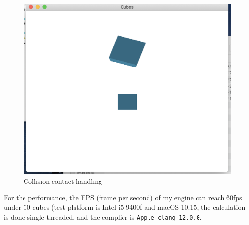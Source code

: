 \documentclass[acmtog]{acmart}
\begin{document}
\begin{enumerate}
\begin{figure}[H]
			\centering
			\includegraphics[scale=0.2]{collresp.png}			
			\caption{Collision contact handling}
		\end{figure}
	\end{enumerate}
	For the performance, the FPS (frame per second) of my engine can reach \~60fps under \~10 cubes (test platform is Intel i5-9400f and 
	macOS 10.15, the calculation is done single-threaded, and the complier is \texttt{Apple clang 12.0.0}.
\end{document}
